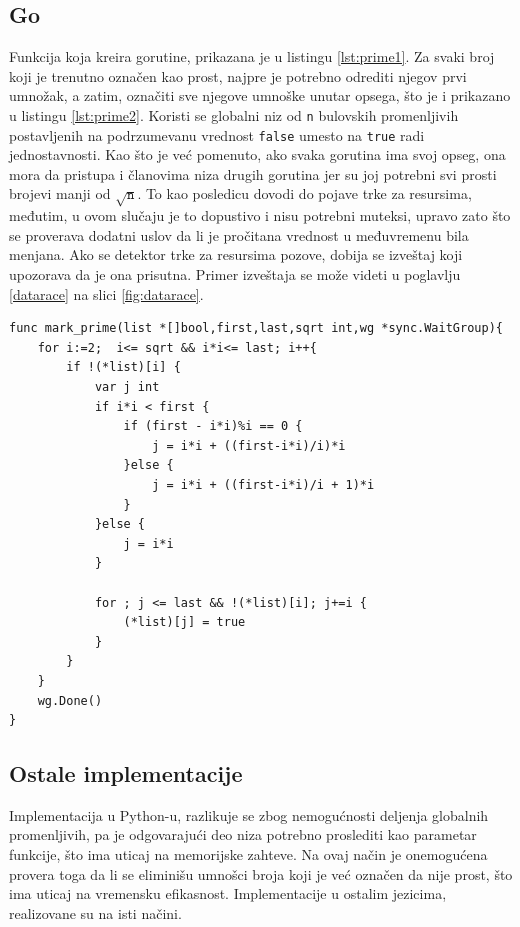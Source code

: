 \documentclass[12pt,oneside]{memoir}
\begin{document}
\subsection{Go}
Funkcija koja kreira gorutine, prikazana je u listingu \ref{lst:prime1}. Za svaki broj koji je trenutno označen kao prost, najpre je potrebno odrediti njegov prvi umnožak, a zatim, označiti sve njegove umnoške unutar opsega, što je i prikazano u listingu \ref{lst:prime2}. Koristi se globalni niz od \texttt{n} bulovskih promenljivih postavljenih na podrzumevanu vrednost \texttt{false} umesto na \texttt{true} radi jednostavnosti. Kao što je već pomenuto, ako svaka gorutina ima svoj opseg, ona mora da pristupa i članovima niza drugih gorutina jer su joj potrebni svi prosti brojevi manji od $\sqrt{\texttt{n}}$. To kao posledicu dovodi do pojave trke za resursima, međutim, u ovom slučaju je to dopustivo i nisu potrebni muteksi, upravo zato što se proverava dodatni uslov da li je pročitana vrednost u međuvremenu bila menjana. Ako se detektor trke za resursima pozove, dobija se izveštaj koji upozorava da je ona prisutna. Primer izveštaja se može videti u poglavlju \ref{datarace} na slici \ref{fig:datarace}. 

\begin{center}
\begin{lstlisting}[caption=Implementacija konkurentne funkcije za označavanje prostih brojeva u jeziku Go,label={lst:prime2}, backgroundcolor=\color{background}]
func mark_prime(list *[]bool,first,last,sqrt int,wg *sync.WaitGroup){
	for i:=2;  i<= sqrt && i*i<= last; i++{
		if !(*list)[i] {
			var j int
			if i*i < first {
				if (first - i*i)%i == 0 {
					j = i*i + ((first-i*i)/i)*i
				}else {
					j = i*i + ((first-i*i)/i + 1)*i
				}
			}else {
				j = i*i
			}
		
			for ; j <= last && !(*list)[i]; j+=i {
				(*list)[j] = true
			}
		}
	}
	wg.Done()
}
\end{lstlisting}
\end{center}

\subsection{Ostale implementacije}
Implementacija u Python-u, razlikuje se zbog nemogućnosti deljenja globalnih promenljivih, pa je odgovarajući deo niza potrebno proslediti kao parametar funkcije, što ima uticaj na memorijske zahteve. Na ovaj način je onemogućena provera toga da li se eliminišu umnošci broja koji je već označen da nije prost, što ima uticaj na vremensku efikasnost. Implementacije u ostalim jezicima, realizovane su na isti načini.
\end{document}
